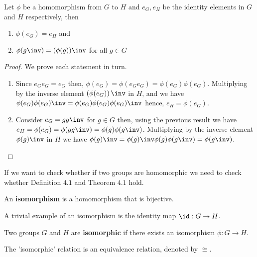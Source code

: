 \documentclass[12pt, a4paper]{article}
\begin{document}
\begin{theorem}
    Let \(\phi\) be a homomorphism from \(G\) to \(H\) and \(e_G,e_H\) be the identity elements in \(G\) and \(H\) respectively, then
    \begin{enumerate}
        \item \(\phi(e_G)=e_H\) and 
        \item \(\phi(g\inv)=(\phi(g))\inv\) for all \(g \in G\)
    \end{enumerate}
\end{theorem}

\begin{proof}
    We prove each statement in turn.
    \begin{enumerate}
        \item Since \(e_G e_G =e_G\) then, \(\phi(e_G)=\phi(e_G e_G)=\phi(e_G)\phi(e_G)\). Multiplying by the inverse element \(\left( \phi(e_G) \right)\inv\) in \(H\), and we have \(\phi(e_G)\phi(e_G)\inv = \phi(e_G)\phi(e_G)\phi(e_G)\inv\) hence, \(e_H = \phi(e_G)\).
        \item Consider \(e_G = gg\inv\) for \(g \in G\) then, using the previous result we have \(e_H = \phi(e_G) = \phi(gg\inv)=\phi(g)\phi(g\inv)\). Multiplying by the inverse element \(\phi(g)\inv\) in \(H\) we have \(\phi(g)\inv=\phi(g)\inv\phi(g)\phi(g\inv)=\phi(g\inv)\).
    \end{enumerate}
\end{proof}

\begin{mdnote}
    If we want to check whether if two groups are homomorphic we need to check  whether Definition \(4.1\) and Theorem \(4.1\) hold.
\end{mdnote}

\begin{definition}
    An \textbf{isomorphism} is a homomorphism that is bijective.
\end{definition}

\begin{example}
    A trivial example of an isomorphism is the identity map \(\id :G \to H\).
\end{example}

\begin{definition}
    Two groups \(G\) and \(H\) are \textbf{isomorphic} if there exists an isomorphism \(\phi : G\to H\).
\end{definition}

\begin{mdthm}
    The 'isomorphic' relation is an equivalence relation, denoted by \(\cong\).
\end{mdthm}
\end{document}
